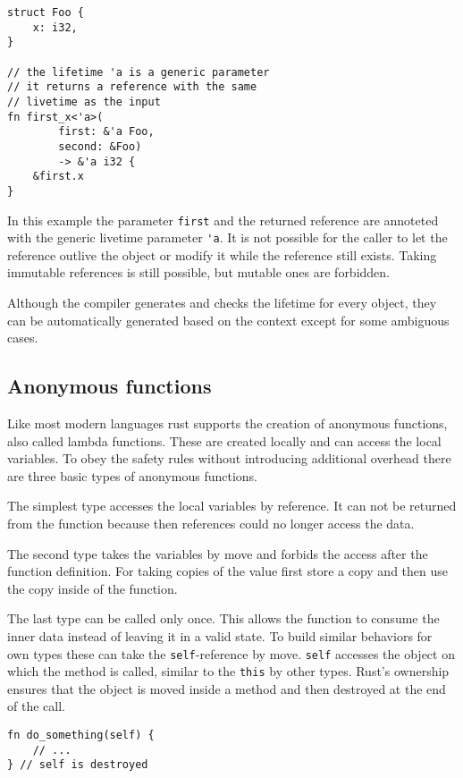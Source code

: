 \documentclass[conference,twocolumn]{IEEEtran}
\begin{document}
\begin{lstlisting}[frame=single]
struct Foo {
    x: i32,
}

// the lifetime 'a is a generic parameter
// it returns a reference with the same 
// livetime as the input
fn first_x<'a>(
        first: &'a Foo,
        second: &Foo)
        -> &'a i32 {
    &first.x
}
\end{lstlisting}
In this example the parameter \verb|first| and the returned reference are annoteted with the generic livetime parameter \verb|'a|. It is not possible for the caller to let the reference outlive the object or modify it while the reference still exists. Taking immutable references is still possible, but mutable ones are forbidden.

Although the compiler generates and checks the lifetime for every object, they can be automatically generated based on the context except for some ambiguous cases.

\subsection{Anonymous functions}
Like most modern languages rust supports the creation of anonymous functions, also called lambda functions. These are created locally and can access the local variables. To obey the safety rules without introducing additional overhead there are three basic types of anonymous functions.

The simplest type accesses the local variables by reference. It can not be returned from the function because then references could no longer access the data.

The second type takes the variables by move and forbids the access after the function definition. For taking copies of the value first store a copy and then use the copy inside of the function.

The last type can be called only once. This allows the function to consume the inner data instead of leaving it in a valid state. To build similar behaviors for own types these can take the \verb|self|-reference by move. \verb|self| accesses the object on which the method is called, similar to the \verb|this| by other types. Rust's ownership ensures that the object is moved inside a method and then destroyed at the end of the call. \cite{RustBook}
\begin{lstlisting}[frame=single]
fn do_something(self) {
    // ...
} // self is destroyed
\end{lstlisting}
\end{document}
